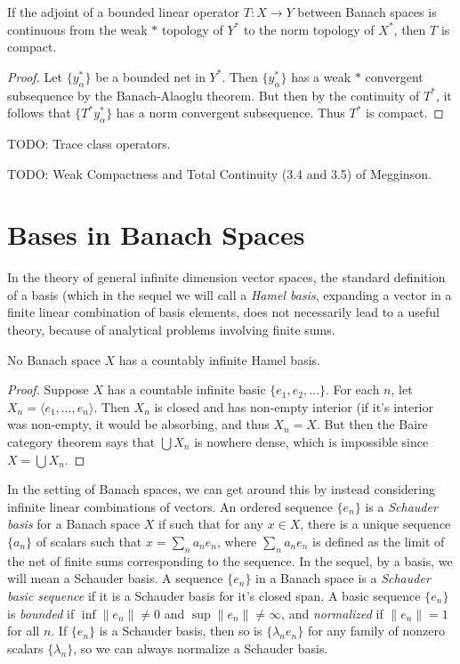 \begin{theorem}
    If the adjoint of a bounded linear operator $T: X \to Y$ between Banach spaces is continuous from the weak $*$ topology of $Y^*$ to the norm topology of $X^*$, then $T$ is compact.
\end{theorem}
\begin{proof}
    Let $\{ y_\alpha^* \}$ be a bounded net in $Y^*$. Then $\{ y_\alpha^* \}$ has a weak $*$ convergent subsequence by the Banach-Alaoglu theorem. But then by the continuity of $T^*$, it follows that $\{ T^* y_\alpha^* \}$ has a norm convergent subsequence. Thus $T^*$ is compact.
\end{proof}

TODO: Trace class operators.

TODO: Weak Compactness and Total Continuity (3.4 and 3.5) of Megginson.








\section{Bases in Banach Spaces}

In the theory of general infinite dimension vector spaces, the standard definition of a basis (which in the sequel we will call a \emph{Hamel basis}, expanding a vector in a finite linear combination of basis elements, does not necessarily lead to a useful theory, because of analytical problems involving finite sums.

\begin{theorem}
    No Banach space $X$ has a countably infinite Hamel basis.
\end{theorem}
\begin{proof}
    Suppose $X$ has a countable infinite basic $\{ e_1, e_2, \dots \}$. For each $n$, let $X_n = \langle e_1, \dots, e_n \rangle$. Then $X_n$ is closed and has non-empty interior (if it's interior was non-empty, it would be absorbing, and thus $X_n = X$. But then the Baire category theorem says that $\bigcup X_n$ is nowhere dense, which is impossible since $X = \bigcup X_n$.
\end{proof}

In the setting of Banach spaces, we can get around this by instead considering infinite linear combinations of vectors. An ordered sequence $\{ e_n \}$ is a \emph{Schauder basis} for a Banach space $X$ if such that for any $x \in X$, there is a unique sequence $\{ a_n \}$ of scalars such that $x = \sum_n a_n e_n$, where $\sum_n a_n e_n$ is defined as the limit of the net of finite sums corresponding to the sequence. In the sequel, by a basis, we will mean a Schauder basis. A sequence $\{ e_n \}$ in a Banach space is a \emph{Schauder basic sequence} if it is a Schauder basis for it's closed span. A basic sequence $\{ e_n \}$ is \emph{bounded} if $\inf \| e_n \| \neq 0$ and $\sup \| e_n \| \neq \infty$, and \emph{normalized} if $\| e_n \| = 1$ for all $n$. If $\{ e_n \}$ is a Schauder basis, then so is $\{ \lambda_n e_n \}$ for any family of nonzero scalars $\{ \lambda_n \}$, so we can always normalize a Schauder basis.


